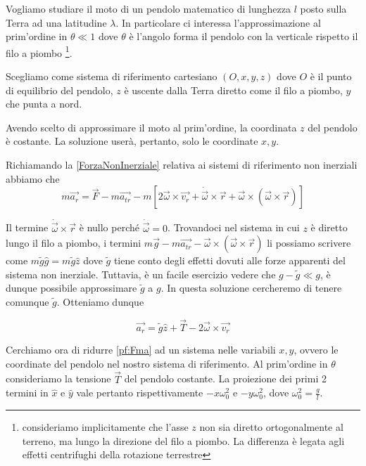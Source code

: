 \documentclass[../main.tex]{subfiles}
\begin{document}

\textex

Vogliamo studiare il moto di un pendolo matematico di lunghezza $l$ posto sulla Terra ad una latitudine $\lambda$.
In particolare ci interessa l'approssimazione al prim'ordine in $\theta \ll 1 $ dove $\theta$ è l'angolo forma il pendolo
con la verticale rispetto il filo a piombo
\footnote{consideriamo implicitamente che l'asse $z$ non sia diretto ortogonalmente al terreno,
ma lungo la direzione del filo a piombo. La differenza è legata agli effetti centrifughi della rotazione terrestre}.

\solution
Scegliamo come sistema di riferimento cartesiano $(O, x,y,z)$ dove $O$ è il punto di equilibrio del pendolo, $z$ è uscente
dalla Terra diretto come il filo a piombo, $y$ che punta a nord.

Avendo scelto di approssimare il moto al prim'ordine, la coordinata $z$ del pendolo è costante. La soluzione userà, pertanto,
solo le coordinate $x,y$.

Richiamando la \cref{ForzaNonInerziale} relativa ai sistemi di riferimento non inerziali abbiamo che 
\[
  m\vec{a_r}=\vec{F}-m\vec{a_{tr}}-m\left[2\vec{\omega}\times\vec{v_r}+\dot{\vec{\omega}}\times\vec{r}+
  \vec{\omega}\times(\vec{\omega}\times\vec{r})\right]
\]

Il termine $\dot{\vec{\omega}}\times\vec{r}$ è nullo perché $\dot{\vec{\omega}}=0$.
Trovandoci nel sistema in cui $z$ è diretto lungo il filo a piombo, i termini
$m\vec{g}-m\overrightarrow{a_{tr}}-\vec{\omega}\times(\vec{\omega}\times\vec{r})$ li possiamo scrivere come
$m\tilde{g}\hat{g} = m\tilde{g}\hat{z}$ dove $\tilde{g}$ tiene conto degli effetti
dovuti alle forze apparenti del sistema non inerziale. Tuttavia, è un facile esercizio vedere che $g-\tilde{g}\ll g$, è dunque
possibile approssimare $\tilde{g}$ a $g$. In questa soluzione cercheremo di tenere comunque $\tilde{g}$. Otteniamo dunque

\begin{equation}
 \label{pf:Fma}
  \vec{a_r}=\tilde{g}\hat{z}+\vec{T}-2\vec{\omega}\times\vec{v_r} 
\end{equation}


Cerchiamo ora di ridurre \cref{pf:Fma} ad un sistema nelle variabili $x,y$, ovvero le coordinate del pendolo nel nostro sistema di riferimento.
Al prim'ordine in $\theta$ consideriamo la tensione $\vec{T}$ del pendolo costante. La proiezione dei primi 2 termini in $\hat{x}$ e $\hat{y}$
vale pertanto rispettivamente $-x\omega^2_0$ e $-y\omega^2_0$, dove $\omega^2_0 = \frac{g}{l}$.
\end{document}
